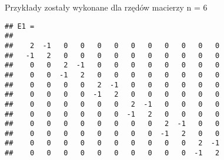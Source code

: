 	Przykłady zostały wykonane dla rzędów macierzy n = 6
		
\begin{samepage}
\begin{Shaded}
\begin{Highlighting}[]
\NormalTok{,}\NormalTok{;}
        
\NormalTok{A=[}\NormalTok{, -}\NormalTok{;-}\NormalTok{,}\NormalTok{];}
\NormalTok{B=[}\NormalTok{,-}\NormalTok{;}\NormalTok{,}\NormalTok{];}
\NormalTok{C=[}\NormalTok{,}\NormalTok{;}\NormalTok{,}\NormalTok{];}
        
\NormalTok{;}
        
\NormalTok{(}
\end{Highlighting}
\end{Shaded}
\end{samepage}
\begin{samepage}
\begin{verbatim}
## E1 =
## 
##    2  -1   0   0   0   0   0   0   0   0   0   0
##   -1   2   0   0   0   0   0   0   0   0   0   0
##    0   0   2  -1   0   0   0   0   0   0   0   0
##    0   0  -1   2   0   0   0   0   0   0   0   0
##    0   0   0   0   2  -1   0   0   0   0   0   0
##    0   0   0   0  -1   2   0   0   0   0   0   0
##    0   0   0   0   0   0   2  -1   0   0   0   0
##    0   0   0   0   0   0  -1   2   0   0   0   0
##    0   0   0   0   0   0   0   0   2  -1   0   0
##    0   0   0   0   0   0   0   0  -1   2   0   0
##    0   0   0   0   0   0   0   0   0   0   2  -1
##    0   0   0   0   0   0   0   0   0   0  -1   2
\end{verbatim}
\end{samepage}

\begin{samepage}
\begin{Shaded}
	\begin{Highlighting}[]
\NormalTok{(}
	\end{Highlighting}
\end{Shaded}
\end{samepage}

